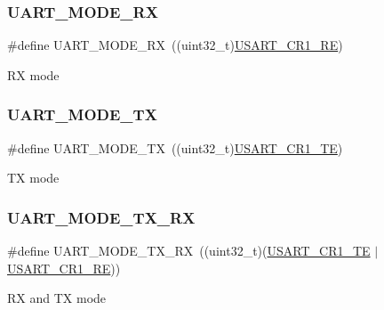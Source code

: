 \subsubsection{\texorpdfstring{U\+A\+R\+T\+\_\+\+M\+O\+D\+E\+\_\+\+RX}{UART\_MODE\_RX}}
{\footnotesize\ttfamily \#define U\+A\+R\+T\+\_\+\+M\+O\+D\+E\+\_\+\+RX~((uint32\+\_\+t)\hyperlink{group___peripheral___registers___bits___definition_gada0d5d407a22264de847bc1b40a17aeb}{U\+S\+A\+R\+T\+\_\+\+C\+R1\+\_\+\+RE})}

RX mode \mbox{\label{group___u_a_r_t___mode_gad54f095a1073bcd81787d13fc268bd62}} 
\subsubsection{\texorpdfstring{U\+A\+R\+T\+\_\+\+M\+O\+D\+E\+\_\+\+TX}{UART\_MODE\_TX}}
{\footnotesize\ttfamily \#define U\+A\+R\+T\+\_\+\+M\+O\+D\+E\+\_\+\+TX~((uint32\+\_\+t)\hyperlink{group___peripheral___registers___bits___definition_gade7f090b04fd78b755b43357ecaa9622}{U\+S\+A\+R\+T\+\_\+\+C\+R1\+\_\+\+TE})}

TX mode \mbox{\label{group___u_a_r_t___mode_gab47c162935901e89322e2ce6700b6744}} 
\subsubsection{\texorpdfstring{U\+A\+R\+T\+\_\+\+M\+O\+D\+E\+\_\+\+T\+X\+\_\+\+RX}{UART\_MODE\_TX\_RX}}
{\footnotesize\ttfamily \#define U\+A\+R\+T\+\_\+\+M\+O\+D\+E\+\_\+\+T\+X\+\_\+\+RX~((uint32\+\_\+t)(\hyperlink{group___peripheral___registers___bits___definition_gade7f090b04fd78b755b43357ecaa9622}{U\+S\+A\+R\+T\+\_\+\+C\+R1\+\_\+\+TE} $\vert$\hyperlink{group___peripheral___registers___bits___definition_gada0d5d407a22264de847bc1b40a17aeb}{U\+S\+A\+R\+T\+\_\+\+C\+R1\+\_\+\+RE}))}

RX and TX mode 